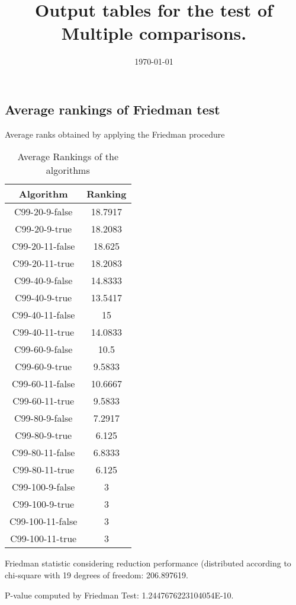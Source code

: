 \documentclass[a4paper,10pt]{article}
\title{Output tables for the test of Multiple comparisons.}
\author{}
\date{\today}
\begin{document}
\begin{landscape}
\pagestyle{empty}
\maketitle
\thispagestyle{empty}
\section{Average rankings of Friedman test}



Average ranks obtained by applying the Friedman procedure

\begin{table}[!htp]
\centering
\begin{tabular}{|c|c|}\hline
Algorithm&Ranking\\\hline
C99-20-9-false & 18.7917\\
C99-20-9-true & 18.2083\\
C99-20-11-false & 18.625\\
C99-20-11-true & 18.2083\\
C99-40-9-false & 14.8333\\
C99-40-9-true & 13.5417\\
C99-40-11-false & 15\\
C99-40-11-true & 14.0833\\
C99-60-9-false & 10.5\\
C99-60-9-true & 9.5833\\
C99-60-11-false & 10.6667\\
C99-60-11-true & 9.5833\\
C99-80-9-false & 7.2917\\
C99-80-9-true & 6.125\\
C99-80-11-false & 6.8333\\
C99-80-11-true & 6.125\\
C99-100-9-false & 3\\
C99-100-9-true & 3\\
C99-100-11-false & 3\\
C99-100-11-true & 3\\
\hline
\end{tabular}
\caption{Average Rankings of the algorithms}
\end{table}

Friedman statistic considering reduction performance (distributed according to chi-square with 19 degrees of freedom: 206.897619.

P-value computed by Friedman Test: 1.2447676223104054E-10.\newline




\end{landscape}
\end{document}
